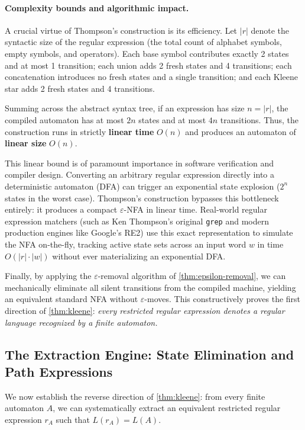\paragraph{Complexity bounds and algorithmic impact.}
A crucial virtue of Thompson's construction is its efficiency. Let $|r|$ denote the syntactic size of the regular expression (the total count of alphabet symbols, empty symbols, and operators). Each base symbol contributes exactly 2 states and at most 1 transition; each union adds 2 fresh states and 4 transitions; each concatenation introduces no fresh states and a single transition; and each Kleene star adds 2 fresh states and 4 transitions.

Summing across the abstract syntax tree, if an expression has size $n = |r|$, the compiled automaton has at most $2n$ states and at most $4n$ transitions. Thus, the construction runs in strictly \textbf{linear time} $O(n)$ and produces an automaton of \textbf{linear size} $O(n)$.

This linear bound is of paramount importance in software verification and compiler design. Converting an arbitrary regular expression directly into a deterministic automaton (DFA) can trigger an exponential state explosion ($2^n$ states in the worst case). Thompson's construction bypasses this bottleneck entirely: it produces a compact $\varepsilon$-NFA in linear time. Real-world regular expression matchers (such as Ken Thompson's original \texttt{grep} and modern production engines like Google's RE2) use this exact representation to simulate the NFA on-the-fly, tracking active state sets across an input word $w$ in time $O(|r|\cdot|w|)$ without ever materializing an exponential DFA.

Finally, by applying the $\varepsilon$-removal algorithm of \cref{thm:epsilon-removal}, we can mechanically eliminate all silent transitions from the compiled machine, yielding an equivalent standard NFA without $\varepsilon$-moves. This constructively proves the first direction of \cref{thm:kleene}: \emph{every restricted regular expression denotes a regular language recognized by a finite automaton.}

\subsection{The Extraction Engine: State Elimination and Path Expressions}
\label{subsec:state-elimination}

We now establish the reverse direction of \cref{thm:kleene}: from every finite automaton $A$, we can systematically extract an equivalent restricted regular expression $r_A$ such that $L(r_A) = L(A)$.

